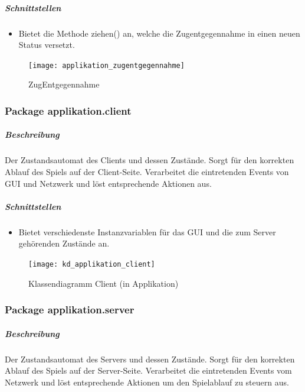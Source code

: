 \documentclass[12pt,halfparskip]{scrartcl}
\begin{document}
\subparagraph{Schnittstellen} %
\label{ssub:schnittstellen}
\begin{itemize}
	\item Bietet die Methode ziehen() an, welche die Zugentgegennahme in einen neuen Status versetzt.
\end{itemize}

\begin{figure}[h]
	\centering
	\texttt{[image: applikation\_zugentgegennahme]}
	\caption{ZugEntgegennahme}
	\label{fig:applikation_zugentgegennahme}
\end{figure}


\clearpage
\subsubsection{Package applikation.client}
\label{ssub:package_applikation_client} %
\subparagraph{Beschreibung}
\label{ssub:beschreibung}
Der Zustandsautomat des Clients und dessen Zustände. Sorgt für den korrekten Ablauf des Spiels auf der Client-Seite. Verarbeitet die eintretenden Events von GUI und Netzwerk und löst entsprechende Aktionen aus.

\subparagraph{Schnittstellen}
\label{ssub:schnittstellen}
\begin{itemize}
	\item Bietet verschiedenste Instanzvariablen für das GUI und die zum Server gehörenden Zustände an.
\end{itemize}

\begin{figure}[h]
	\centering
	\texttt{[image: kd\_applikation\_client]}
	\caption{Klassendiagramm Client (in Applikation)}
	\label{fig:kd_applikation_client}
\end{figure}

\clearpage
\subsubsection{Package applikation.server}
\label{ssub:package_applikation_server} %
\subparagraph{Beschreibung}
\label{ssub:beschreibung}
Der Zustandsautomat des Servers und dessen Zustände. Sorgt für den korrekten Ablauf des Spiels auf der Server-Seite. Verarbeitet die eintretenden Events vom Netzwerk und löst entsprechende Aktionen um den Spielablauf zu steuern aus.
\end{document}
